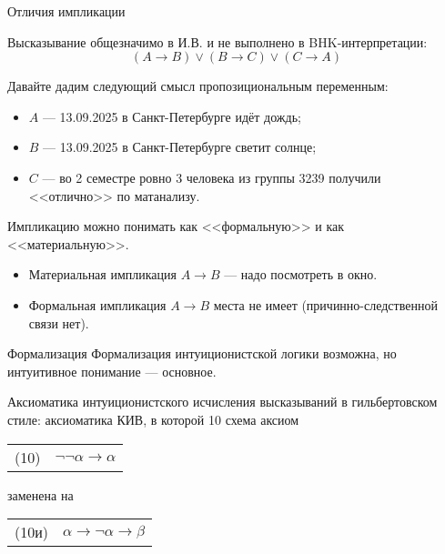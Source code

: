 \documentclass[aspectratio=169]{beamer}
\begin{document}
\begin{frame}{Отличия импликации}

Высказывание общезначимо в И.В. и не выполнено в BHK-интерпретации:
$$(A \rightarrow B) \vee (B \rightarrow C) \vee (C \rightarrow A)$$\pause

Давайте дадим следующий смысл пропозициональным переменным:
\begin{itemize}
\item $A$ --- 13.09.2025 в Санкт-Петербурге идёт дождь;
\item $B$ --- 13.09.2025 в Санкт-Петербурге светит солнце;
\item $C$ --- во 2 семестре ровно 3 человека из группы 3239 получили <<отлично>> по матанализу.
\end{itemize}\pause

Импликацию можно понимать как <<формальную>> и как <<материальную>>.
\begin{itemize}
\item Материальная импликация $A\rightarrow B$ --- надо посмотреть в окно.\pause

\item Формальная импликация $A\rightarrow B$ места не имеет (причинно-следственной связи нет).
\end{itemize}

\end{frame}

\begin{frame}{Формализация}
Формализация интуиционистской логики возможна, но интуитивное понимание --- основное.

\begin{defrus}Аксиоматика интуиционистского исчисления высказываний в гильбертовском стиле: 
аксиоматика КИВ, в которой 10 схема аксиом

\begin{center}\begin{tabular}{ll}
(10) & $\neg \neg \alpha \rightarrow \alpha$
\end{tabular}\end{center}

заменена на 

\begin{center}\begin{tabular}{ll}
(10и) & $\alpha \rightarrow \neg\alpha \rightarrow \beta$
\end{tabular}\end{center}
\end{defrus}
\end{frame}
\end{document}

